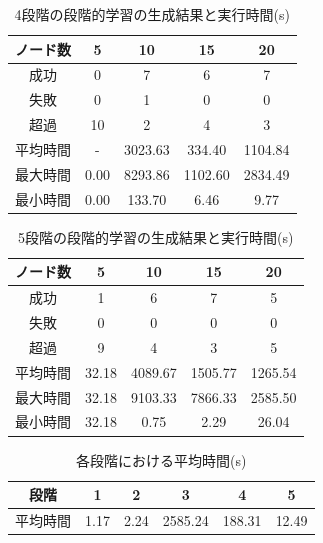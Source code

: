 \documentclass[exploratorypaper]{jsaiart} %
\begin{document}
\begin{table}[t]
\caption{4段階の段階的学習の生成結果と実行時間(s)}
\label{tbl:result2}
\begin{tabular}{c|cccc}
    ノード数&	5&	10&	15&	20\\
    \hline
    成功&	0&	7&	6&	7\\
    失敗&	0&	1&	0&	0\\
    超過&	10&	2&	4&	3\\
    \hline \hline
    平均時間&	-&	3023.63&	334.40&	1104.84\\
    最大時間&	0.00&	8293.86&	1102.60&	2834.49\\
    最小時間&	0.00&	133.70&	6.46&	9.77\\
    \hline
\end{tabular}
\end{table}

\begin{table}[t]
\caption{5段階の段階的学習の生成結果と実行時間(s)}
\label{tbl:result3}
\begin{tabular}{c|cccc}
    ノード数&	5&	10&	15&	20\\
    \hline
    成功&	1&	6&	7&	5\\
    失敗&	0&	0&	0&	0\\
    超過&	9&	4&	3&	5\\
    \hline \hline
    平均時間&	32.18&	4089.67&	1505.77&	1265.54\\
    最大時間&	32.18&	9103.33&	7866.33&	2585.50\\
    最小時間&	32.18&	0.75&	2.29&	26.04\\
    \hline
\end{tabular}
\end{table}

\begin{table}[t]
\caption{各段階における平均時間(s)}
\label{tbl:result4}
\begin{tabular}{c|ccccc}
    段階&	1&	2&	3&	4&	5\\
    \hline
    平均時間&	1.17&	2.24&	2585.24&	188.31&	12.49\\
\end{tabular}
\end{table}


\end{document}

